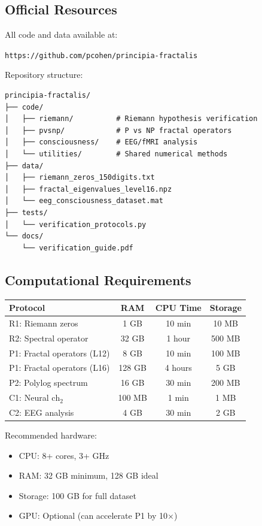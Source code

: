 \subsection{Official Resources}

All code and data available at:

\begin{center}
\texttt{https://github.com/pcohen/principia-fractalis}
\end{center}

Repository structure:
\begin{verbatim}
principia-fractalis/
├── code/
│   ├── riemann/          # Riemann hypothesis verification
│   ├── pvsnp/            # P vs NP fractal operators
│   ├── consciousness/    # EEG/fMRI analysis
│   └── utilities/        # Shared numerical methods
├── data/
│   ├── riemann_zeros_150digits.txt
│   ├── fractal_eigenvalues_level16.npz
│   └── eeg_consciousness_dataset.mat
├── tests/
│   └── verification_protocols.py
└── docs/
    └── verification_guide.pdf
\end{verbatim}

\subsection{Computational Requirements}

\begin{center}
\begin{tabular}{|l|c|c|c|}
\hline
\textbf{Protocol} & \textbf{RAM} & \textbf{CPU Time} & \textbf{Storage} \\
\hline
R1: Riemann zeros & 1 GB & 10 min & 10 MB \\
R2: Spectral operator & 32 GB & 1 hour & 500 MB \\
P1: Fractal operators (L12) & 8 GB & 10 min & 100 MB \\
P1: Fractal operators (L16) & 128 GB & 4 hours & 5 GB \\
P2: Polylog spectrum & 16 GB & 30 min & 200 MB \\
C1: Neural $\text{ch}_2$ & 100 MB & 1 min & 1 MB \\
C2: EEG analysis & 4 GB & 30 min & 2 GB \\
\hline
\end{tabular}
\end{center}

Recommended hardware:
\begin{itemize}
\item CPU: 8+ cores, 3+ GHz
\item RAM: 32 GB minimum, 128 GB ideal
\item Storage: 100 GB for full dataset
\item GPU: Optional (can accelerate P1 by 10×)
\end{itemize}

